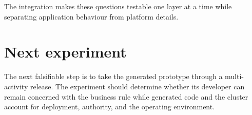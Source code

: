 The integration makes these questions testable one layer at a time while
separating application behaviour from platform details.

\section{Next experiment}

The next falsifiable step is to take the generated prototype through a
multi-activity release. The experiment should determine whether its developer
can remain concerned with the business rule while generated code and the
cluster account for deployment, authority, and the operating environment.

\endinput
